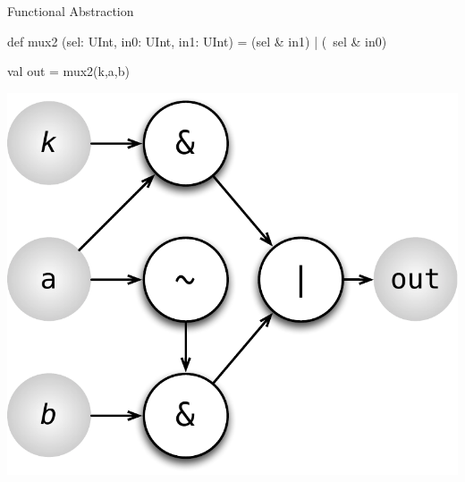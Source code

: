 \documentclass[xcolor=pdflatex,dvipsnames,table]{beamer}
\begin{document}
\begin{frame}[fragile]{Functional Abstraction}
\begin{scala}
def mux2 (sel: UInt, in0: UInt, in1: UInt) = 
  (sel & in1) | (~sel & in0)

val out = mux2(k,a,b)
\end{scala}
\begin{center}
\includegraphics[height=0.7\textheight]{figs/mux2-function.pdf} 
\end{center}
\end{frame}
\end{document}
